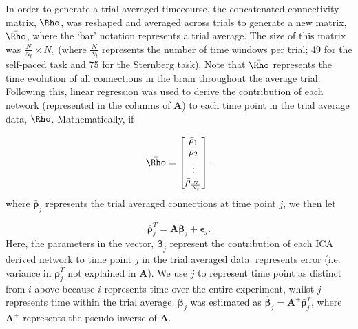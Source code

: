 In order to generate a trial averaged timecourse, the concatenated connectivity matrix, $\mathbf{\Rho}$, was reshaped and averaged across trials to generate a new matrix, $\bar{\mathbf{\Rho}}$, where the ‘bar’ notation represents a trial average. The size of this matrix was $\frac{N}{N_t}\times N_c$  (where $\frac{N}{N_t}$ represents the number of time windows per trial; 49 for the self-paced task and 75 for the Sternberg task). Note that $\bar{\mathbf{\Rho}}$ represents the time evolution of all connections in the brain throughout the average trial. Following this, linear regression was used to derive the contribution of each network (represented in the columns of \textbf{A}) to each time point in the trial average data, $\bar{\mathbf{\Rho}}$. Mathematically, if

\begin{equation}
	\bar{\mathbf{\Rho}} = 
	\begin{bmatrix}
		\bar{\mathbf{\rho}}_1 \\ \bar{\mathbf{\rho}}_2 \\ \vdots \\ \bar{\mathbf{\rho}}_{\frac{N}{N_t}}
	\end{bmatrix},
\end{equation} where $\bar{\mathbf{\rho}}_j$ represents the trial averaged connections at time point $j$, we then let

\begin{equation}
	\bar{\mathbf{\rho}}_j^T = \mathbf{A}\mathbf{\beta}_j+\mathbf{\epsilon}_j.
\end{equation} Here, the parameters in the vector, $\mathbf{\beta}_j$ represent the contribution of each ICA derived network to time point $j$ in the trial averaged data.  represents error (i.e. variance in $\bar{\mathbf{\rho}}_j^T$ not explained in \textbf{A}). We use $j$ to represent time point as distinct from $i$ above because $i$ represents time over the entire experiment, whilst $j$ represents time within the trial average. $\mathbf{\beta}_j$ was estimated as $\hat{\mathbf{\beta}}_j=\mathbf{A}^+\bar{\mathbf{\rho}}_j^T$, where $\mathbf{A}^+$ represents the pseudo-inverse of \textbf{A}.

